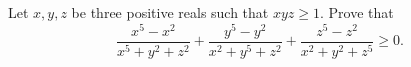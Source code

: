 Let $x,y,z$ be three positive reals such that $xyz\geq 1$. Prove that\[ \frac { x^5-x^2 }{x^5+y^2+z^2} + \frac {y^5-y^2}{x^2+y^5+z^2} + \frac {z^5-z^2}{x^2+y^2+z^5} \geq 0 . \]
